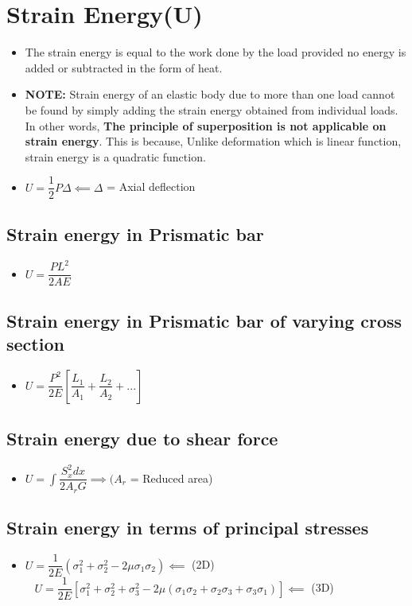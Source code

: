 \documentclass[8pt]{report}
\begin{document}
	\section{Strain Energy(U)}
		\begin{itemize}
			\item The strain energy is equal to the work done by the load provided no energy is added or subtracted in the form of heat.
			\item \textbf{NOTE: } Strain energy of an elastic body due to more than one load cannot be found by simply adding the strain energy obtained from individual loads. In other words, \textbf{The principle of superposition is not applicable on strain energy}. This is because, Unlike deformation which is linear function, strain energy is a quadratic function. 
			\item $\boxed{U = \dfrac{1}{2}P\Delta} \impliedby \Delta$ = Axial deflection 
		\end{itemize}\hrulefill
		\subsection{Strain energy in Prismatic bar}
			\begin{itemize}
				\item $\boxed{U = \dfrac{PL^2}{2AE}}$
			\end{itemize}\hrulefill
		\subsection{Strain energy in Prismatic bar of varying cross section}
			\begin{itemize}
				\item $\boxed{U = \dfrac{P^2}{2E}\left[\dfrac{L_1}{A_1}+\dfrac{L_2}{A_2}+...\right]}$
			\end{itemize}\hrulefill
		\subsection{Strain energy due to shear force}
			\begin{itemize}
				\item $\boxed{U = \int\dfrac{S_x^2dx}{2A_rG}}\implies (A_r$ = Reduced area)
			\end{itemize}\hrulefill
		\subsection{Strain energy in terms of principal stresses}
			\begin{itemize}
				\item $\boxed{U = \dfrac{1}{2E}(\sigma_1^2+\sigma_2^2-2\mu\sigma_1\sigma_2)} \impliedby$ (2D) $\;\;\;\boxed{U = \dfrac{1}{2E}\left[\sigma_1^2+\sigma_2^2+\sigma_3^2-2\mu(\sigma_1\sigma_2+\sigma_2\sigma_3+\sigma_3\sigma_1)\right]} \impliedby$ (3D)
			\end{itemize}\hrulefill
\end{document}
